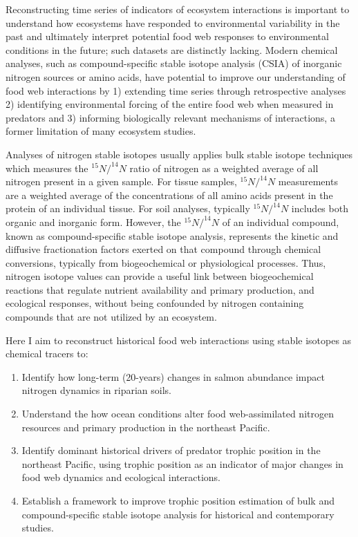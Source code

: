 \documentclass [11pt, proquest] {uwthesis}[2015/03/03]
\begin{document}
Reconstructing time series of indicators of ecosystem interactions is
important to understand how ecosystems have responded to environmental
variability in the past and ultimately interpret potential food web
responses to environmental conditions in the future; such datasets are
distinctly lacking. Modern chemical analyses, such as compound-specific
stable isotope analysis (CSIA) of inorganic nitrogen sources or amino
acids, have potential to improve our understanding of food web
interactions by 1) extending time series through retrospective analyses
2) identifying environmental forcing of the entire food web when
measured in predators and 3) informing biologically relevant mechanisms
of interactions, a former limitation of many ecosystem studies.

Analyses of nitrogen stable isotopes usually applies bulk stable isotope
techniques which measures the \(^{15}N/^{14}N\) ratio of nitrogen as a
weighted average of all nitrogen present in a given sample. For tissue
samples, \(^{15}N/^{14}N\) measurements are a weighted average of the
concentrations of all amino acids present in the protein of an
individual tissue. For soil analyses, typically \(^{15}N/^{14}N\)
includes both organic and inorganic form. However, the \(^{15}N/^{14}N\)
of an individual compound, known as compound-specific stable isotope
analysis, represents the kinetic and diffusive fractionation factors
exerted on that compound through chemical conversions, typically from
biogeochemical or physiological processes. Thus, nitrogen isotope values
can provide a useful link between biogeochemical reactions that regulate
nutrient availability and primary production, and ecological responses,
without being confounded by nitrogen containing compounds that are not
utilized by an ecosystem.

Here I aim to reconstruct historical food web interactions using stable
isotopes as chemical tracers to:
\begin{enumerate}
\def\labelenumi{\arabic{enumi}.}
\item
  Identify how long-term (20-years) changes in salmon abundance impact
  nitrogen dynamics in riparian soils.
\item
  Understand the how ocean conditions alter food web-assimilated
  nitrogen resources and primary production in the northeast Pacific.
\item
  Identify dominant historical drivers of predator trophic position in
  the northeast Pacific, using trophic position as an indicator of major
  changes in food web dynamics and ecological interactions.
\item
  Establish a framework to improve trophic position estimation of bulk
  and compound-specific stable isotope analysis for historical and
  contemporary studies.
\end{enumerate}
\end{document}

